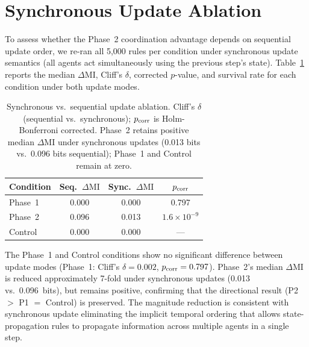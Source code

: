 \documentclass[letterpaper]{article}
\begin{document}
\section{Synchronous Update Ablation}
\label{app:synchronous_ablation}

To assess whether the Phase~2 coordination advantage depends on sequential
update order, we re-ran all 5{,}000 rules per condition under synchronous
update semantics (all agents act simultaneously using the previous step's
state). Table~\ref{tab:synchronous} reports the median $\Delta\mathrm{MI}$,
Cliff's $\delta$, corrected $p$-value, and survival rate for each condition
under both update modes.

\begin{table}[htbp]
\centering
\caption{Synchronous vs.\ sequential update ablation.
Cliff's $\delta$ (sequential vs.\ synchronous); $p_{\rm corr}$ is
Holm-Bonferroni corrected. Phase~2 retains positive median $\Delta\mathrm{MI}$
under synchronous updates (0.013 bits vs.\ 0.096 bits sequential);
Phase~1 and Control remain at zero.}
\label{tab:synchronous}
\begin{tabular}{lccc}
\toprule
Condition & Seq.\ $\Delta\mathrm{MI}$ & Sync.\ $\Delta\mathrm{MI}$ & $p_{\rm corr}$ \\
\midrule
Phase~1  & 0.000 & 0.000 & 0.797 \\
Phase~2  & 0.096 & 0.013 & $1.6\times 10^{-9}$ \\
Control  & 0.000 & 0.000 & --- \\
\bottomrule
\end{tabular}
\end{table}

The Phase~1 and Control conditions show no significant difference between
update modes (Phase~1: Cliff's $\delta=0.002$, $p_{\rm corr}=0.797$).
Phase~2's median $\Delta\mathrm{MI}$ is reduced approximately 7-fold
under synchronous updates (0.013 vs.\ 0.096~bits), but remains positive,
confirming that the directional result (P2~$>$ P1 $=$ Control) is preserved.
The magnitude reduction is consistent with synchronous update eliminating
the implicit temporal ordering that allows state-propagation rules to
propagate information across multiple agents in a single step.

\end{document}
